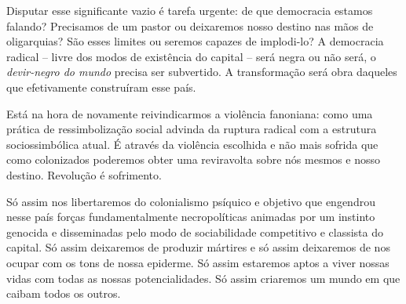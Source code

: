 Disputar esse significante vazio é tarefa urgente: de que democracia
estamos falando? Precisamos de um pastor ou deixaremos nosso destino nas
mãos de oligarquias? São esses limites ou seremos capazes de implodi-lo?
A democracia radical -- livre dos modos de existência do capital -- será
negra ou não será, o \emph{devir-negro do mundo} precisa ser subvertido.
A transformação será obra daqueles que efetivamente construíram esse
país.

Está na hora de novamente reivindicarmos a violência fanoniana: como uma
prática de ressimbolização social advinda da ruptura radical com a
estrutura sociossimbólica atual. É através da violência escolhida e não
mais sofrida que como colonizados poderemos obter uma reviravolta sobre
nós mesmos e nosso destino. Revolução é sofrimento.

Só assim nos libertaremos do colonialismo psíquico e objetivo que
engendrou nesse país forças fundamentalmente necropolíticas animadas por
um instinto genocida e disseminadas pelo modo de sociabilidade
competitivo e classista do capital. Só assim deixaremos de produzir
mártires e só assim deixaremos de nos ocupar com os tons de nossa
epiderme. Só assim estaremos aptos a viver nossas vidas com todas as
nossas potencialidades. Só assim criaremos um mundo em que caibam todos
os outros.
